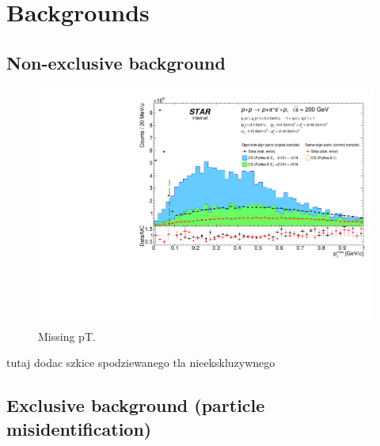 
\chapter{Backgrounds}\label{chap:backgrounds}

\section{Non-exclusive background}\label{sec:nonExclBkgd}

\begin{figure}[ht!]
\centering%
\includegraphics[width=0.65\linewidth,page=1]{graphics/backgrounds/Raw_MissingPtPid.pdf}%
\caption{Missing pT.}\label{fig:missingPtBkgd}%
\end{figure}
tutaj dodac szkice spodziewanego tla nieekskluzywnego

\section{Exclusive background (particle misidentification)}\label{sec:exclBkgd}

